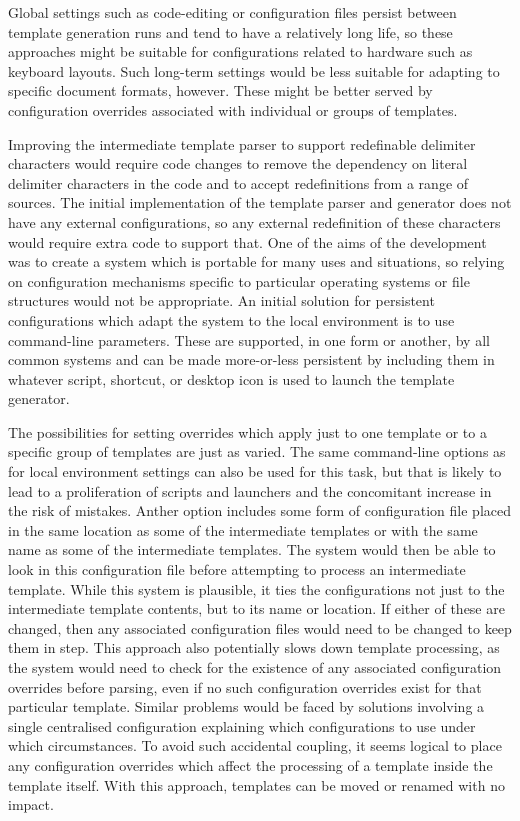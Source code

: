 Global settings such as code-editing or configuration files persist between template generation runs and tend to have a relatively long life, so these approaches might be suitable for configurations related to hardware such as keyboard layouts. Such long-term settings would be less suitable for adapting to specific document formats, however. These might be better served by configuration overrides associated with individual or groups of templates.

Improving the intermediate template parser to support redefinable delimiter characters would require code changes to remove the dependency on literal delimiter characters in the code and to accept redefinitions from a range of sources. The initial implementation of the template parser and generator does not have any external configurations, so any external redefinition of these characters would require extra code to support that. One of the aims of the development was to create a system which is portable for many uses and situations, so relying on configuration mechanisms specific to particular operating systems or file structures would not be appropriate. An initial solution for persistent configurations which adapt the system to the local environment is to use command-line parameters. These are supported, in one form or another, by all common systems and can be made more-or-less persistent by including them in whatever script, shortcut, or desktop icon is used to launch the template generator.

The possibilities for setting overrides which apply just to one template or to a specific group of templates are just as varied. The same command-line options as for local environment settings can also be used for this task, but that is likely to lead to a proliferation of scripts and launchers and the concomitant increase in the risk of mistakes. Anther option includes some form of configuration file placed in the same location as some of the intermediate templates or with the same name as some of the intermediate templates. The system would then be able to look in this configuration file before attempting to process an intermediate template. While this system is plausible, it ties the configurations not just to the intermediate template contents, but to its name or location. If either of these are changed, then any associated configuration files would need to be changed to keep them in step. This approach also potentially slows down template processing, as the system would need to check for the existence of any associated configuration overrides before parsing, even if no such configuration overrides exist for that particular template. Similar problems would be faced by solutions involving a single centralised configuration explaining which configurations to use under which circumstances. To avoid such accidental coupling, it seems logical to place any configuration overrides which affect the processing of a template inside the template itself. With this approach, templates can be moved or renamed with no impact.

